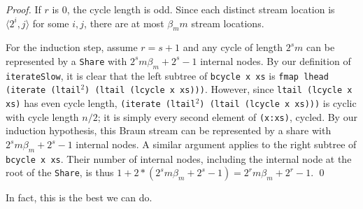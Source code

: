 \documentclass[envcountsect]{llncs}
\newcommand{\share}{{\tt Share} }
\begin{document}
\begin{proof}
If $r$ is $0$, the cycle length is odd.
Since each distinct stream location is $\langle 2^i,j \rangle$ for some $i, j$, there are at most $\beta_m m$ stream locations.

For the induction step, assume $r = s+1$ and any cycle of length $2^s m$ can be represented by a \share with $2^s m \beta_m + 2^s - 1$ internal nodes.
By our definition of {\tt iterateSlow}, it is clear that the left subtree of {\tt bcycle x xs} is {\tt fmap lhead (iterate (ltail}$^2${\tt ) (ltail (lcycle x xs)))}.
However, since {\tt ltail (lcycle x xs)} has even cycle length, {\tt (iterate (ltail}$^2${\tt ) (ltail (lcycle x xs)))} is cyclic with cycle length $n/2$;
it is simply every second element of {\tt (x:xs)}, cycled.
By our induction hypothesis, this Braun stream can be represented by a share with $2^s m \beta_m + 2^s - 1$ internal nodes.
A similar argument applies to the right subtree of {\tt bcycle x xs}.
Their number of internal nodes, including the internal node at the root of the {\tt Share}, is thus $1+2*(2^s m \beta_m + 2^s - 1) = 2^r m \beta_m + 2^r - 1$.
\qed
\end{proof}

In fact, this is the best we can do.
\end{document}
